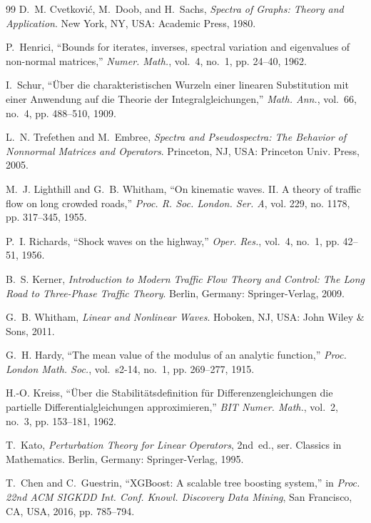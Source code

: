 \documentclass[journal]{IEEEtran}
\begin{document}
\begin{thebibliography}{99}
D.~M. Cvetkovi\'c, M.~Doob, and H.~Sachs, \emph{Spectra of Graphs: Theory and Application}. New York, NY, USA: Academic Press, 1980.

P.~Henrici, ``Bounds for iterates, inverses, spectral variation and eigenvalues of non-normal matrices,'' \emph{Numer. Math.}, vol.~4, no.~1, pp. 24--40, 1962.

I.~Schur, ``\"Uber die charakteristischen Wurzeln einer linearen Substitution mit einer Anwendung auf die Theorie der Integralgleichungen,'' \emph{Math. Ann.}, vol.~66, no.~4, pp. 488--510, 1909.

L.~N. Trefethen and M.~Embree, \emph{Spectra and Pseudospectra: The Behavior of Nonnormal Matrices and Operators}. Princeton, NJ, USA: Princeton Univ. Press, 2005.

M.~J. Lighthill and G.~B. Whitham, ``On kinematic waves. II. A theory of traffic flow on long crowded roads,'' \emph{Proc. R. Soc. London. Ser. A}, vol. 229, no. 1178, pp. 317--345, 1955.

P.~I. Richards, ``Shock waves on the highway,'' \emph{Oper. Res.}, vol.~4, no.~1, pp. 42--51, 1956.

B.~S. Kerner, \emph{Introduction to Modern Traffic Flow Theory and Control: The Long Road to Three-Phase Traffic Theory}. Berlin, Germany: Springer-Verlag, 2009.

G.~B. Whitham, \emph{Linear and Nonlinear Waves}. Hoboken, NJ, USA: John Wiley \& Sons, 2011.

G.~H. Hardy, ``The mean value of the modulus of an analytic function,'' \emph{Proc. London Math. Soc.}, vol.~s2-14, no.~1, pp. 269--277, 1915.

H.-O. Kreiss, ``\"Uber die Stabilit\"atsdefinition f\"ur Differenzengleichungen die partielle Differentialgleichungen approximieren,'' \emph{BIT Numer. Math.}, vol.~2, no.~3, pp. 153--181, 1962.

T.~Kato, \emph{Perturbation Theory for Linear Operators}, 2nd~ed., ser. Classics in Mathematics. Berlin, Germany: Springer-Verlag, 1995.

T.~Chen and C.~Guestrin, ``{XGBoost}: A scalable tree boosting system,'' in \emph{Proc. 22nd ACM SIGKDD Int. Conf. Knowl. Discovery Data Mining}, San Francisco, CA, USA, 2016, pp. 785--794.


\end{thebibliography}
\end{document}

